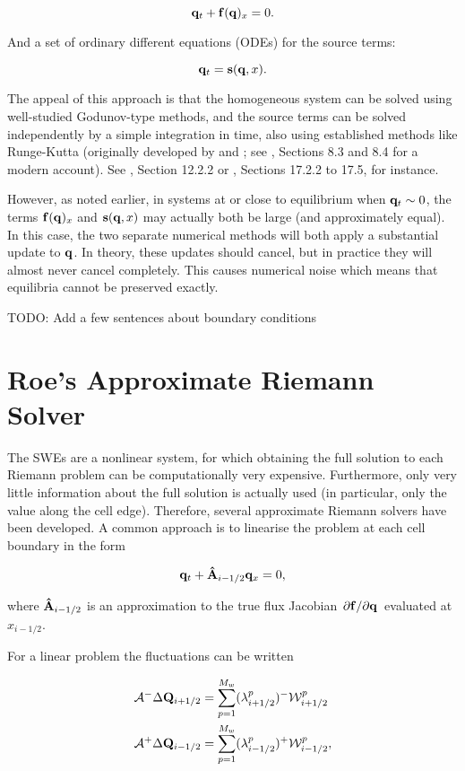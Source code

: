 $$
  \vb q_t + \vb f(\vb q)_x = 0.
$$

And a set of ordinary different equations (ODEs) for the source terms:

$$
  \vb q_t = \vb s(\vb q, x).
$$

The appeal of this approach is that the homogeneous system can be solved using well-studied Godunov-type methods, and the source terms can be solved independently by a simple integration in time, also using established methods like Runge-Kutta (originally developed by \citet{runge1895numerische} and \citet{kutta1901beitrag}; see \citet{kaw2009numerical}, Sections 8.3 and 8.4 for a modern account). See \citet{toro2001shock}, Section 12.2.2 or \citet{leveque2002finite}, Sections 17.2.2 to 17.5, for instance.

However, as noted earlier, in systems at or close to equilibrium when $\vb q_t \sim 0$, the terms $\vb f(\vb q)_x$ and $\vb s(\vb q, x)$ may actually both be large (and approximately equal). In this case, the two separate numerical methods will both apply a substantial update to $\vb q$. In theory, these updates should cancel, but in practice they will almost never cancel completely. This causes numerical noise which means that equilibria cannot be preserved exactly.

TODO: Add a few sentences about boundary conditions

\section{Roe's Approximate Riemann Solver}
\label{sec:roe}

The SWEs are a nonlinear system, for which obtaining the full solution to each Riemann problem can be computationally very expensive. Furthermore, only very little information about the full solution is actually used (in particular, only the value along the cell edge). Therefore, several approximate Riemann solvers have been developed. A common approach is to linearise the problem at each cell boundary in the form

\begin{align}
  \vb q_t + \vu A_{i-1/2} \vb q_x = 0,
\end{align}

where $\vu A_{i-1/2}$ is an approximation to the true flux Jacobian $\pdv*{\vb f}{\vb q}$ evaluated at $x_{i-1/2}$.

For a linear problem the fluctuations can be written

\begin{subequations}
  \label{eq:approx_fluct}
\begin{align}
  \mathcal{A}^- \Delta \vb Q_{i+1/2} &= \sum_{p=1}^{M_w} (\lambda_{i+1/2}^p)^- \mathcal{W}_{i+1/2}^p \\
  \mathcal{A}^+ \Delta \vb Q_{i-1/2} &= \sum_{p=1}^{M_w} (\lambda_{i-1/2}^p)^+ \mathcal{W}_{i-1/2}^p,
\end{align}
\end{subequations}

